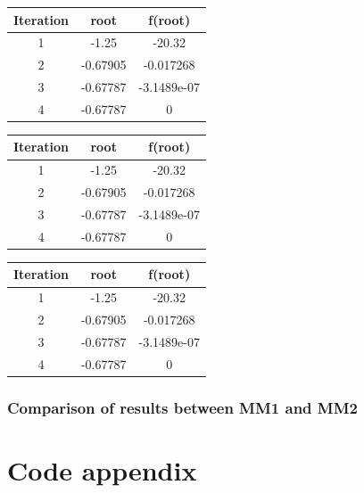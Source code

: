 \documentclass[12pt]{report}
\begin{document}
\begin{center}
  \begin{tabular}{| c  c c |}
\hline
Iteration & root         & f(root) \\
\hline
1    &     -1.25   &       -20.32 \\
\hline
2    & -0.67905    &   -0.017268 \\
\hline
3    &  -0.67787   &  -3.1489e-07 \\
\hline
4    &  -0.67787   &            0 \\
\hline
\hline

\end{tabular}
\end{center}

\begin{center}
  \begin{tabular}{| c  c c |}
\hline
Iteration & root         & f(root) \\
\hline
1    &     -1.25    &      -20.32 \\
\hline
2    &  -0.67905    &   -0.017268 \\
\hline
3    &  -0.67787    & -3.1489e-07 \\
\hline
4    &  -0.67787    &           0 \\
\hline
\hline

\end{tabular}
\end{center}


\begin{center}
  \begin{tabular}{| c  c c |}
\hline
Iteration & root         & f(root) \\
\hline
1    &     -1.25    &      -20.32 \\
\hline
2    &  -0.67905    &   -0.017268 \\
\hline
3    &  -0.67787    & -3.1489e-07 \\
\hline
4    &  -0.67787    &           0 \\
\hline
\hline

\end{tabular}
\end{center}


\subsection{Comparison of results between MM1 and MM2}

\chapter{Code appendix}
\end{document}
